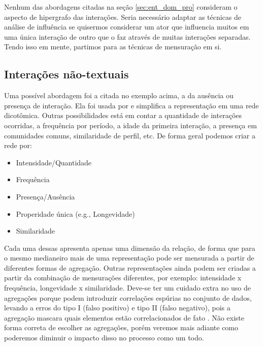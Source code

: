 \documentclass{article}
\begin{document}
Nenhum das abordagens citadas na seção \ref{sec:ent_dom_pro} consideram o
aspecto de hipergrafo das interações. Seria necessário adaptar as técnicas de
análise de influência se quisermos considerar um ator que influencia muitos em
uma única interação de outro que o faz através de muitas interações separadas.
Tendo isso em mente, partimos para as técnicas de mensuração em si.

\subsection{Interações não-textuais}

Uma possível abordagem foi a citada no exemplo acima, a da ausência ou presença
de interação. Ela foi usada por \cite{Xiang2010} e simplifica a representação em
uma rede dicotômica. Outras possibilidades está em contar a quantidade de
interações ocorridas, a frequência por período, a idade da primeira interação, a
presença em comunidades comuns, similaridade de perfil, etc. De forma geral
podemos criar a rede por:

\begin{itemize}
\item Intensidade/Quantidade
\item Frequência
\item Presença/Ausência
\item Properidade única (e.g., Longevidade)
\item Similaridade
\end{itemize}

Cada uma dessas apresenta apenas uma dimensão da relação, de forma que para o
mesmo medianeiro mais de uma representação pode ser mensurada a partir de
diferentes formas de agregação. Outras representações ainda podem ser criadas a
partir da combinação de mensurações diferentes, por exemplo: intensidade x
frequência, longevidade x similaridade. Deve-se ter um cuidado extra no uso de
agregações porque podem introduzir correlações espúrias no conjunto de dados,
levando a erros do tipo I (falso positivo) e tipo II (falso negativo), pois a
agregação mascara quais elementos estão correlacionados de fato
\cite{Jensen2003}. Não existe forma correta de escolher as agregações, porém
veremos mais adiante como poderemos diminuir o impacto disso no processo como um
todo.
\end{document}
